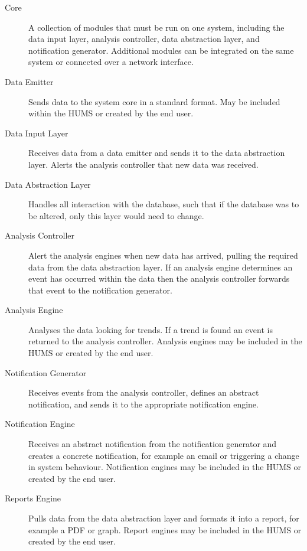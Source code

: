 \documentclass[10pt,a4paper]{article}
\begin{document}
\begin{description}
  \item[Core] A collection of modules that must be run on one system, including the data input layer, analysis controller, data abstraction layer, and notification generator. Additional modules can be integrated on the same system or connected over a network interface.

  \item[Data Emitter] Sends data to the system core in a standard
    format. May be included within the HUMS or created by the end
    user.

  \item[Data Input Layer] Receives data from a data emitter and sends
    it to the data abstraction layer. Alerts the analysis controller
    that new data was received.

  \item[Data Abstraction Layer] Handles all interaction with the
    database, such that if the database was to be altered, only this
    layer would need to change.

  \item[Analysis Controller] Alert the analysis engines when new data
    has arrived, pulling the required data from the data abstraction
    layer. If an analysis engine determines an event has occurred
    within the data then the analysis controller forwards that event
    to the notification generator.

  \item[Analysis Engine] Analyses the data looking for trends. If a
    trend is found an event is returned to the analysis
    controller. Analysis engines may be included in the HUMS or
    created by the end user.

  \item[Notification Generator] Receives events from the analysis
    controller, defines an abstract notification, and sends it to the
    appropriate notification engine.

  \item[Notification Engine] Receives an abstract notification from
    the notification generator and creates a concrete notification,
    for example an email or triggering a change in system
    behaviour. Notification engines may be included in the HUMS or
    created by the end user.

  \item[Reports Engine] Pulls data from the data abstraction layer and
    formats it into a report, for example a PDF or graph. Report
    engines may be included in the HUMS or created by the end user.
\end{description}
\end{document}
